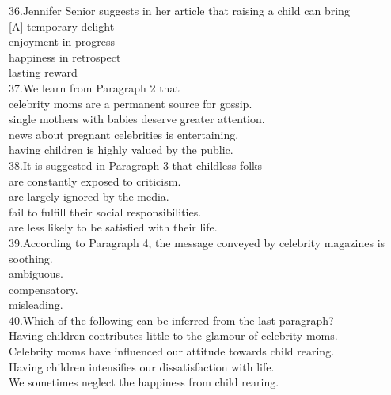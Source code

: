 \begin{tabbing}
36.Jennifer Senior suggests in her article that raising a child can bring\\
\= [A] temporary delight\\
\> [B] enjoyment in progress\\
\> [C] happiness in retrospect\\
\> [D] lasting reward\\
37.We learn from Paragraph 2 that\\
\> [A] celebrity moms are a permanent source for gossip.\\
\> [B] single mothers with babies deserve greater attention.\\
\> [C] news about pregnant celebrities is entertaining.\\
\> [D] having children is highly valued by the public.\\
38.It is suggested in Paragraph 3 that childless folks\\
\> [A] are constantly exposed to criticism.\\
\> [B] are largely ignored by the media.\\
\> [C] fail to fulfill their social responsibilities.\\
\> [D] are less likely to be satisfied with their life. \\
39.According to Paragraph 4, the message conveyed by celebrity magazines is\\
\> [A] soothing.\\
\> [B] ambiguous.\\
\> [C] compensatory.\\
\> [D] misleading.\\
40.Which of the following can be inferred from the last paragraph?\\
\> [A] Having children contributes little to the glamour of celebrity moms.\\
\> [B] Celebrity moms have influenced our attitude towards child rearing.\\
\> [C] Having children intensifies our dissatisfaction with life.\\
\> [D] We sometimes neglect the happiness from child rearing.
\end{tabbing}
